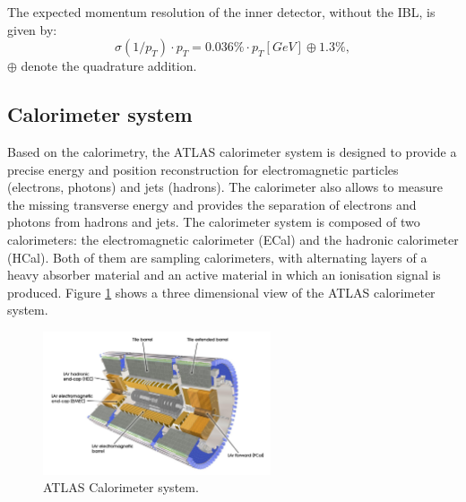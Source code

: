 The expected momentum resolution of the inner detector, without the IBL, is given by:
\begin{equation}
    \sigma(1/p_T)\cdot p_T = 0.036\%\cdot p_T [GeV] \oplus 1.3\%,
\end{equation}
$\oplus$ denote the quadrature addition.
\subsection{Calorimeter system}
\label{chap2:ATLAS:Calo}

Based on the calorimetry, the ATLAS calorimeter system is designed to provide a precise energy and position reconstruction for electromagnetic particles (electrons, photons) and jets (hadrons). The calorimeter also allows to measure the missing transverse energy and provides the separation of electrons and photons from hadrons and jets. The calorimeter system is composed of two calorimeters: the electromagnetic calorimeter (ECal) and the hadronic calorimeter (HCal). Both of them are sampling calorimeters, with alternating layers of a heavy absorber material and an active material in which an ionisation signal is produced. Figure \ref{fig:chap2:ATLAS:Calo} shows a three dimensional view of the ATLAS calorimeter system.
\begin{figure}[H]
    \centering
    \includegraphics[width=0.6\textwidth]{Ch2/Img/Calo.png}
    \caption{ATLAS Calorimeter system.}
    \label{fig:chap2:ATLAS:Calo}
\end{figure}

